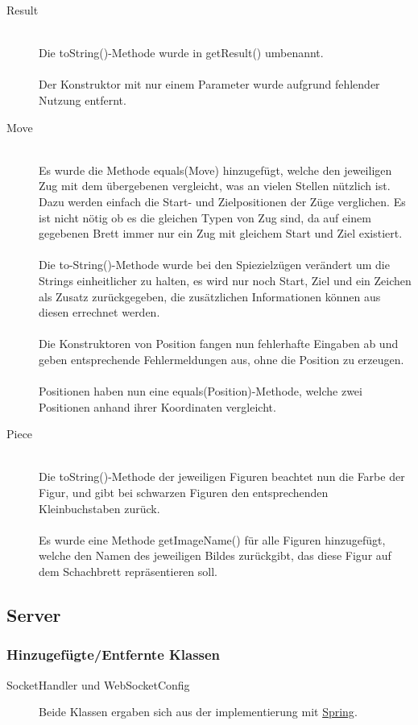 \documentclass[parskip=full]{scrartcl}
\begin{document}
\begin{description}
		\item[Result]\hfill \\ Die toString()-Methode wurde in getResult() umbenannt.\\
		\\
		Der Konstruktor mit nur einem Parameter wurde aufgrund fehlender Nutzung entfernt.
		
		\item[Move]\hfill \\ Es wurde die Methode equals(Move) hinzugefügt, welche den jeweiligen Zug mit dem übergebenen vergleicht, was an vielen Stellen nützlich ist. Dazu werden einfach die Start- und Zielpositionen der Züge verglichen. Es ist nicht nötig ob es die gleichen Typen von Zug sind, da auf einem gegebenen Brett immer nur ein Zug mit gleichem Start und Ziel existiert.\\
		\\
		Die to-String()-Methode wurde bei den Spiezielzügen verändert um die Strings einheitlicher zu halten, es wird nur noch Start, Ziel und ein Zeichen als Zusatz zurückgegeben, die zusätzlichen Informationen können aus diesen errechnet werden.\\
		\\
		Die Konstruktoren von Position fangen nun fehlerhafte Eingaben ab und geben entsprechende Fehlermeldungen aus, ohne die Position zu erzeugen.\\
		\\
		Positionen haben nun eine equals(Position)-Methode, welche zwei Positionen anhand ihrer Koordinaten vergleicht.
		\item[Piece]\hfill \\ Die toString()-Methode der jeweiligen Figuren beachtet nun die Farbe der Figur, und gibt bei schwarzen Figuren den entsprechenden Kleinbuchstaben zurück. \\
		\\
		Es wurde eine Methode getImageName() für alle Figuren hinzugefügt, welche den Namen des jeweiligen Bildes zurückgibt, das diese Figur auf dem Schachbrett repräsentieren soll.
		
		
		\end{description}
		\subsection{Server}
		\subsubsection{Hinzugefügte/Entfernte Klassen}
		\begin{description}
			\item[SocketHandler und WebSocketConfig] Beide Klassen ergaben sich aus der implementierung mit \href{https://spring.io/}{Spring}.		
		\end{description}
\end{document}
